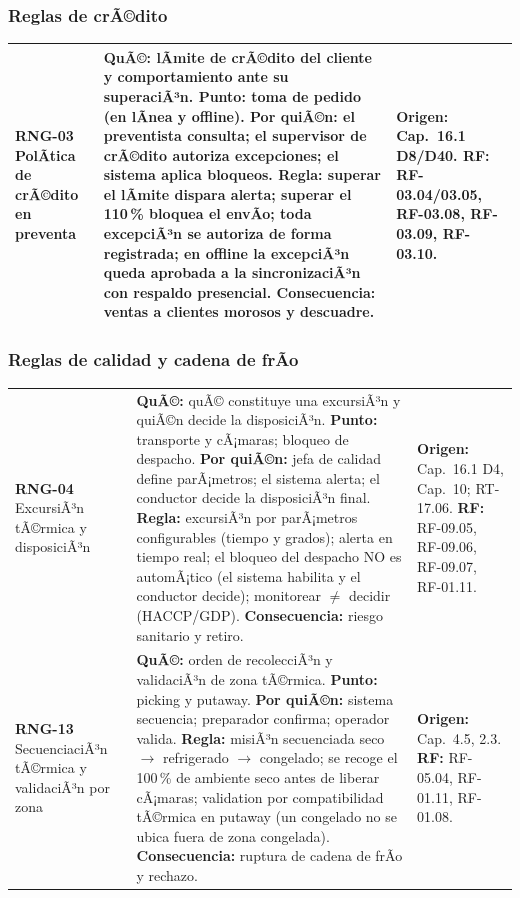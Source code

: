 \subsubsection{Reglas de crÃ©dito}

\begin{table}[htbp]
\centering
\small
\begin{tabularx}{\textwidth}{@{}L{2.4cm}L{8.3cm}L{4.2cm}@{}}
\toprule
\textbf{RNG-03} \textbar{} PolÃ­tica de crÃ©dito en preventa &
\textbf{QuÃ©:} lÃ­mite de crÃ©dito del cliente y comportamiento ante su superaciÃ³n.
\textbf{Punto:} toma de pedido (en lÃ­nea y offline). \textbf{Por quiÃ©n:} el preventista
consulta; el supervisor de crÃ©dito autoriza excepciones; el sistema aplica bloqueos.
\textbf{Regla:} superar el lÃ­mite dispara alerta; superar el 110\,\% bloquea el envÃ­o;
toda excepciÃ³n se autoriza de forma registrada; en offline la excepciÃ³n queda
aprobada a la sincronizaciÃ³n con respaldo presencial. \textbf{Consecuencia:} ventas a
clientes morosos y descuadre. &
\textbf{Origen:} Cap.\ 16.1 D8/D40. \textbf{RF:} RF-03.04/03.05, RF-03.08,
RF-03.09, RF-03.10. \\
\bottomrule
\end{tabularx}
\end{table}

\subsubsection{Reglas de calidad y cadena de frÃ­o}

\begin{table}[htbp]
\centering
\small
\begin{tabularx}{\textwidth}{@{}L{2.4cm}L{8.3cm}L{4.2cm}@{}}
\toprule
\textbf{RNG-04} \textbar{} ExcursiÃ³n tÃ©rmica y disposiciÃ³n &
\textbf{QuÃ©:} quÃ© constituye una excursiÃ³n y quiÃ©n decide la disposiciÃ³n. \textbf{Punto:}
transporte y cÃ¡maras; bloqueo de despacho. \textbf{Por quiÃ©n:} jefa de calidad define
parÃ¡metros; el sistema alerta; el conductor decide la disposiciÃ³n final. \textbf{Regla:}
excursiÃ³n por parÃ¡metros configurables (tiempo y grados); alerta en tiempo real; el
bloqueo del despacho NO es automÃ¡tico (el sistema habilita y el conductor decide);
monitorear $\neq$ decidir (HACCP/GDP). \textbf{Consecuencia:} riesgo sanitario y retiro. &
\textbf{Origen:} Cap.\ 16.1 D4, Cap.\ 10; RT-17.06. \textbf{RF:} RF-09.05, RF-09.06,
RF-09.07, RF-01.11. \\
\addlinespace
\textbf{RNG-13} \textbar{} SecuenciaciÃ³n tÃ©rmica y validaciÃ³n por zona &
\textbf{QuÃ©:} orden de recolecciÃ³n y validaciÃ³n de zona tÃ©rmica. \textbf{Punto:} picking
y putaway. \textbf{Por quiÃ©n:} sistema secuencia; preparador confirma; operador valida.
\textbf{Regla:} misiÃ³n secuenciada seco $\rightarrow$ refrigerado $\rightarrow$ congelado;
se recoge el 100\,\% de ambiente seco antes de liberar cÃ¡maras; validation por
compatibilidad tÃ©rmica en putaway (un congelado no se ubica fuera de zona congelada).
\textbf{Consecuencia:} ruptura de cadena de frÃ­o y rechazo. &
\textbf{Origen:} Cap.\ 4.5, 2.3. \textbf{RF:} RF-05.04, RF-01.11, RF-01.08. \\
\bottomrule
\end{tabularx}
\end{table}

